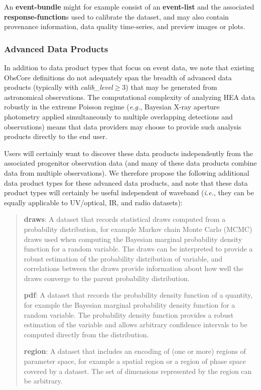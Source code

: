 \documentclass[11pt,a4paper]{ivoa}
\begin{document}
An {\bf event-bundle} might for example consist of an {\bf event-list} and the associated {\bf response-function}s used to calibrate the dataset, and may also contain provenance information, data quality time-series, and preview images or plots.

\subsubsection{Advanced Data Products}

In addition to data product types that focus on event data, we note that existing ObsCore definitions do not adequately span the breadth of advanced data products (typically with {\em calib\_level\/}${}\ge 3$) that may be generated from astronomical observations. The computational complexity of analyzing \gls{HEA} data robustly in the extreme Poisson regime ({\em e.g.\/}, Bayesian X-ray aperture photometry applied simultaneously to multiple overlapping detections and observations) means that data providers may choose to provide such analysis products directly to the end user.

Users will certainly want to discover these data products independently from the associated progenitor observation data (and many of these data products combine data from multiple observations). We therefore propose the following additional data product types for these advanced data products, and note that these data product types will certainly be useful independent of waveband ({\em i.e.\/}, they can be equally applicable to UV/optical, IR, and radio datasets):

\begin{quote}
{\bf draws}:  A dataset that records statistical draws computed from a probability distribution, for example Markov chain Monte Carlo (MCMC) draws used when computing the Bayesian marginal probability density function for a random variable.  The draws can be interpreted to provide a robust estimation of the probability distribution of variable, and correlations between the draws provide information about how well the draws converge to the parent probability distribution.

{\bf pdf}: A dataset that records the probability density function of a quantity, for example the Bayesian marginal probability density function for a random variable.  The probability density function provides a robust estimation of the variable and allows arbitrary confidence intervals to be computed directly from the distribution.

{\bf region}: A dataset that includes an encoding of (one or more) regions of parameter space, for example a spatial region or a region of phase space covered by a dataset.  The set of dimensions represented by the region can be arbitrary.
\end{quote}
\end{document}
